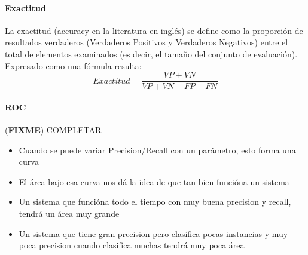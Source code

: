 \documentclass[a4paper,11pt,spanish]{book}
\newcommand*{\FIXME}[1]{{(\textbf{FIXME}) {#1}}}
\begin{document}
	  \paragraph { Exactitud }
	    La exactitud (accuracy en la literatura en inglés) se define como la proporción de resultados verdaderos (Verdaderos Positivos y Verdaderos Negativos) entre el total 
	    de elementos examinados (es decir, el tamaño del conjunto de evaluación). Expresado como una fórmula resulta:\\
	    \begin{equation}
	      Exactitud = {\frac {VP+VN}{VP+VN+FP+FN}}
	    \end{equation}

	  \paragraph {ROC}
	    \FIXME{COMPLETAR}
	    \begin{itemize}
	      \item Cuando se puede variar Precision/Recall con un parámetro, esto forma una curva
	      \item El área bajo esa curva nos dá la idea de que tan bien funcióna un sistema
	      \item Un sistema que funcióna todo el tiempo con muy buena precision y recall, tendrá un área muy grande
	      \item Un sistema que tiene gran precision pero clasifica pocas instancias y muy poca precision cuando clasifica muchas tendrá muy poca área
	    \end{itemize}
\end{document}
